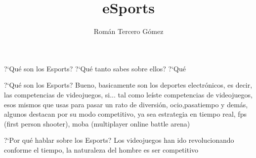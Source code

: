 \documentclass{article}
\title{eSports}
\author{Rom\'an Tercero G\'omez}
\begin{document}

\maketitle
?`Qu\'e son los Esports? ?`Qu\'e tanto sabes sobre ellos? ?`Qu\'e

\newpage
?`Qu\'e son los Esports?
Bueno, basicamente son los deportes electr\'onicos, es decir, las competencias de videojuegos, si... tal como le\'iste competencias de videojuegos, esos mismos que usas para pasar un rato de diversi\'on, ocio,pasatiempo y dem\'as, algunos destacan por su modo competitivo, ya sea estrategia en tiempo real, fps (first person shooter), moba (multiplayer online battle arena)

?`Por qu\'e hablar sobre los Esports?
Los videojuegos han ido revolucionando conforme el tiempo, la naturaleza del hombre es ser competitivo
\end{document}

